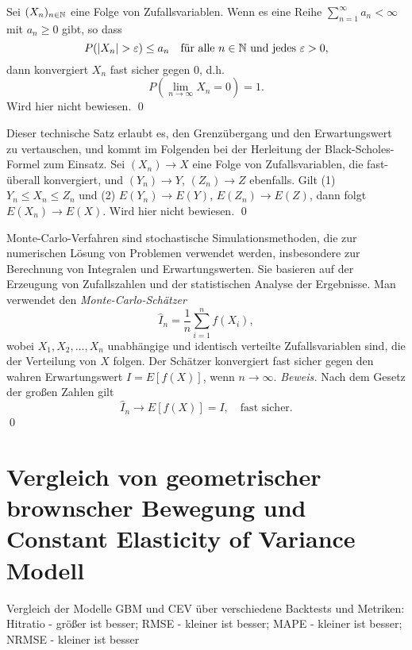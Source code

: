 \begin{lemma}
Sei $(X_n)_{n \in \Bbb N}$ eine Folge von Zufallsvariablen. Wenn es eine Reihe $\sum_{n=1}^\infty a_n \lt \infty$ mit $a_n \geq 0$ gibt, so dass
$$P(|X_n| > \varepsilon) \leq a_n \quad \text{für alle } n \in \Bbb N \text{ und jedes } \varepsilon > 0,$$
dann konvergiert $X_n$ fast sicher gegen $0$, d.h.
$$P\left(\lim_{n \to \infty} X_n = 0\right) = 1.$$
Wird hier nicht bewiesen. \qed
\end{lemma}

\begin{satz}
Dieser technische Satz erlaubt es, den Grenzübergang und den Erwartungswert zu vertauschen, und
kommt im Folgenden bei der Herleitung der Black-Scholes-Formel zum Einsatz.
Sei $(X_n) \longrightarrow X$ eine Folge von Zufallsvariablen, die fast-überall konvergiert,
und $(Y_n) \longrightarrow Y$, $(Z_n) \longrightarrow Z$ ebenfalls.
Gilt (1) $Y_n \le X_n \le Z_n$ und (2) $E(Y_n) \longrightarrow E(Y)$, $E(Z_n) \longrightarrow E(Z)$,
dann folgt $E(X_n) \longrightarrow E(X)$. Wird hier nicht bewiesen. \qed
\end{satz}

\begin{defprop}
Monte-Carlo-Verfahren sind stochastische Simulationsmethoden, die zur numerischen
Lösung von Problemen verwendet werden, insbesondere zur Berechnung von Integralen
und Erwartungswerten. Sie basieren auf der Erzeugung von Zufallszahlen und
der statistischen Analyse der Ergebnisse. Man verwendet den \textit{Monte-Carlo-Schätzer}
$$
\hat{I}_n = \frac{1}{n} \sum_{i=1}^n f(X_i),
$$
wobei $X_1, X_2, \ldots, X_n$ unabhängige und identisch verteilte Zufallsvariablen
sind, die der Verteilung von $X$ folgen. Der Schätzer konvergiert fast sicher
gegen den wahren Erwartungswert $I = E[f(X)]$, wenn $n \to \infty$.
\textit{Beweis.} Nach dem Gesetz der großen Zahlen gilt
$$\hat{I}_n \longrightarrow E[f(X)] = I, \quad \text{fast sicher.}$$ \qed
\end{defprop}

\section{Vergleich von geometrischer brownscher Bewegung und Constant Elasticity of Variance Modell}

\begin{table}
    \centering
    \begin{sideways}
    \end{sideways}
    \caption{Vergleich der Modelle GBM und CEV über verschiedene Backtests und Metriken: Hitratio - größer ist besser; RMSE - kleiner ist besser; MAPE - kleiner ist besser; NRMSE - kleiner ist besser} 
    \label{fig:table_gbm_cev}
\end{table}
